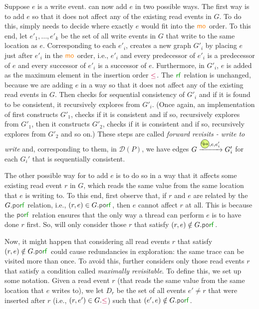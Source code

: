Suppose $e$ is a write event. \trust can now add $e$ in two possible ways. The first way is to add $e$ so that it does not affect any of the existing read events in $G$.  To do this, \trust simply needs to decide where exactly $e$ would fit into the ${\textcolor{orange}{\mathsf{mo}}_{}}$ order. To this end, let $e'_1,\dots,e'_k$ be the
set of all write events in $G$ that write to the same location as $e$. Corresponding to each $e'_i$,
\trust creates a new graph $G'_i$ by placing $e$ just after $e'_i$ in the ${\textcolor{orange}{\mathsf{mo}}_{}}$ order, i.e., $e'_i$ and every predecessor of $e'_i$ is a predecessor of $e$ and every successor of $e'_i$ is a successor of $e$. 
Furthermore, in $G'_i$, $e$ is added as the maximum element in the insertion order $\textcolor{purple}\leq$.
The $\rf{}$ relation is unchanged, because we are adding $e$ in a way so that it does not affect any of the existing read events in $G$. Then \trust checks for sequential consistency of $G'_i$ and if it is found to be consistent, it recursively explores from $G'_i$. (Once again, an implementation of \trust first constructs $G'_1$, checks if it is consistent and if so, recursively explores from $G'_1$, then it constructs $G'_2$, checks if it is consistent and if so, recursively explores from $G'_2$ and so on.) 
These steps are called \emph{forward revisits - write to write} and, corresponding to them, in  $\mathcal{D}(P)$, 
we have edges $G \xrightarrow{\fwdtikz, e, e'_i} G'_i$ for each $G_i'$ that is sequentially consistent. 

The other possible way for \trust to add $e$ is to do so in a way that it affects some existing read event $r$ in $G$, which reads the same value from the same location that $e$ is writing to. To this end, first observe that, if $r$ and $e$ are related by the $G.\porf{}$ relation, i.e., $(r,e) \in G.\porf{}$, then $e$ cannot affect $r$ at all. This is because the $\porf{}$ relation ensures that the only way a thread can perform $e$ is to have done $r$ first. So, \trust will only consider those $r$ that satisfy $(r,e) \notin G.\porf{}$. 

Now, it might happen that considering all read events $r$ that satisfy $(r,e) \notin G.\porf{}$ could cause 
redundancies in exploration: the same trace can be visited more than once. 
To avoid this, \trust further considers only those read events $r$ that satisfy a condition called \emph{maximally revisitable}. To define this, we set up some notation. Given a read event $r$ (that reads the same value from the same location that $e$ writes to), we let $D_r$ be the set of all events $e' \neq r$ that were inserted after $r$ (i.e., $(r,e') \in G.\textcolor{purple}\leq$) such that $(e',e) \notin G.\porf{}$.


